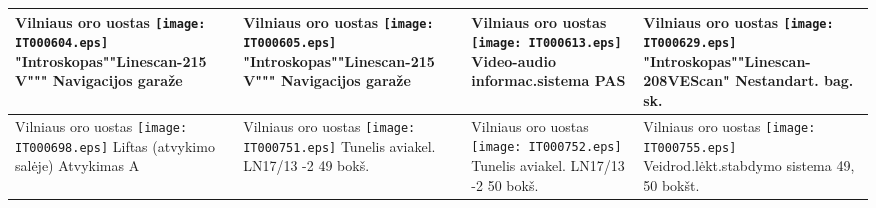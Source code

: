 \documentclass[a4paper,12pt]{article}
\begin{document}
 \tabletail{\hline}
\begin{supertabular}{|p{4.2cm}|p{4.2cm}|p{4.2cm}|p{4.2cm}|} \hline
Vilniaus oro uostas \newline \texttt{[image: IT000604.eps]} \newline "Introskopas""Linescan-215 V""" \newline \footnotesize {Navigacijos garaže
} & Vilniaus oro uostas \newline \texttt{[image: IT000605.eps]} \newline "Introskopas""Linescan-215 V""" \newline \footnotesize {Navigacijos garaže} & Vilniaus oro uostas \newline \texttt{[image: IT000613.eps]} \newline Video-audio informac.sistema \newline \footnotesize {PAS
} & Vilniaus oro uostas \newline \texttt{[image: IT000629.eps]} \newline "Introskopas""Linescan-208VEScan" \newline \footnotesize {Nestandart. bag. sk.}\\\hline
Vilniaus oro uostas \newline \texttt{[image: IT000698.eps]} \newline Liftas (atvykimo salėje) \newline \footnotesize {Atvykimas A} & Vilniaus oro uostas \newline \texttt{[image: IT000751.eps]} \newline Tunelis aviakel. LN17/13 -2 \newline \footnotesize {49 bokš.} & Vilniaus oro uostas \newline \texttt{[image: IT000752.eps]} \newline Tunelis aviakel. LN17/13 -2 \newline \footnotesize {50 bokš.} & Vilniaus oro uostas \newline \texttt{[image: IT000755.eps]} \newline Veidrod.lėkt.stabdymo sistema \newline \footnotesize {49, 50 bokšt.}\\\hline

\end{supertabular}
\end{document}

